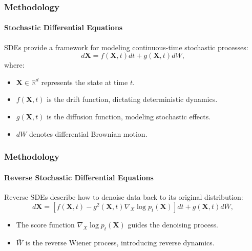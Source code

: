 \documentclass[light]{lutbeamer} %
\begin{document}
\begin{frame}
    \frametitle{Methodology}
    \framesubtitle{Stochastic Differential Equations}

    SDEs provide a framework for modeling continuous-time stochastic processes:
    \begin{equation}
        d\mathbf{X} = f(\mathbf{X}, t)dt + g(\mathbf{X}, t)dW,
    \end{equation}
    where:
    \begin{itemize}
        \item \(\mathbf{X} \in \mathbb{R}^d\) represents the state at time \(t\).
        \item \(f(\mathbf{X}, t)\) is the drift function, dictating deterministic dynamics.
        \item \(g(\mathbf{X}, t)\) is the diffusion function, modeling stochastic effects.
        \item \(dW\) denotes differential Brownian motion.
    \end{itemize}
\end{frame}

\begin{frame}
    \frametitle{Methodology}
    \framesubtitle{Reverse Stochastic Differential Equations}

    Reverse SDEs describe how to denoise data back to its original distribution:
    \begin{equation}
        d\mathbf{X} = \left[f(\mathbf{X}, t) - g^2(\mathbf{X}, t)\nabla_X \log p_t(\mathbf{X})\right]dt + g(\mathbf{X}, t)d\bar{W},
    \end{equation}
    \begin{itemize}
        \item The score function \(\nabla_X \log p_t(\mathbf{X})\) guides the denoising process.
        \item \(\bar{W}\) is the reverse Wiener process, introducing reverse dynamics.
    \end{itemize}
\end{frame}
\end{document}

